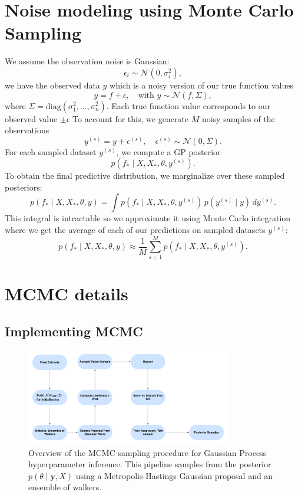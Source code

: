 \documentclass{ucdgradtaughtthesis}
\begin{document}
\section{Noise modeling using Monte Carlo Sampling}
\label{appendix:monte_carlo}

We assume the observation noise is Gaussian:
\[
\epsilon_i \sim \mathcal{N}(0, \sigma_i^2),
\]
we have the observed data \( y \) which is a noisy version of our true function values
\[
y = f + \epsilon, \quad \text{with } y \sim \mathcal{N}(f, \Sigma),
\]
where \( \Sigma = \mathrm{diag}(\sigma_1^2, \dots, \sigma_n^2) \).
Each true function value corresponds to our observed value \(\pm \epsilon\)
To account for this, we generate \( M \) noisy samples of the observations
\begin{equation}
    y^{(s)} = y + \epsilon^{(s)}, \quad \epsilon^{(s)} \sim \mathcal{N}(0, \Sigma).
\end{equation}
For each sampled dataset \( y^{(s)} \), we compute a GP posterior
\begin{equation}
    p(f_* \mid X, X_*, \theta, y^{(s)}).
\end{equation}
To obtain the final predictive distribution, we marginalize over these sampled posteriors:
\begin{equation}
    p(f_* \mid X, X_*, \theta, y) = \int p(f_* \mid X, X_*, \theta, y^{(s)}) \, p(y^{(s)} \mid y) \, dy^{(s)}.
\end{equation}
This integral is intractable so we approximate it using Monte Carlo integration where we get the average of each of our predictions on sampled datasets \(y^{(s)}\):
\begin{equation}
    p(f_* \mid X, X_*, \theta, y) \approx \frac{1}{M} \sum_{s=1}^{M} p(f_* \mid X, X_*, \theta, y^{(s)}).
\end{equation}


\section{MCMC details}
\label{appendix:MCMC}
\subsection*{Implementing MCMC}
\begin{figure}[H]
    \centering
    \includegraphics[width=0.8\textwidth]{LatexPlots/MCMC_Flow.png}
    \caption{Overview of the MCMC sampling procedure for Gaussian Process hyperparameter inference.
     This pipeline samples from the posterior \( p(\theta \mid \mathbf{y}, X) \) using a Metropolis-Hastings Gaussian proposal and an ensemble of walkers.}
    \label{fig:MCMC flowchart}
\end{figure}
%
\end{document}
